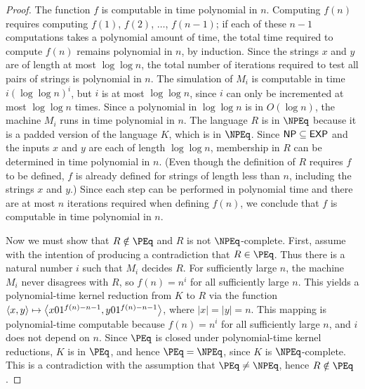 \begin{proof}
  The function $f$ is computable in time polynomial in $n$.
  Computing $f(n)$ requires computing $f(1)$, $f(2)$, $\dotsc$, $f(n - 1)$; if each of these $n - 1$ computations takes a polynomial amount of time, the total time required to compute $f(n)$ remains polynomial in $n$, by induction.
  Since the strings $x$ and $y$ are of length at most $\log \log n$, the total number of iterations required to test all pairs of strings is polynomial in $n$.
  The simulation of $M_i$ is computable in time $i (\log \log n)^i$, but $i$ is at most $\log \log n$, since $i$ can only be incremented at most $\log \log n$ times.
  Since a polynomial in $\log \log n$ is in $O(\log n)$, the machine $M_i$ runs in time polynomial in $n$.
  The language $R$ is in $\NPEq$ because it is a padded version of the language $K$, which is in $\NPEq$.
  Since ${\mathsf{NP}} \subseteq {\ensuremath{\mathsf{EXP}}}$ and the inputs $x$ and $y$ are each of length $\log \log n$, membership in $R$ can be determined in time polynomial in $n$.
  (Even though the definition of $R$ requires $f$ to be defined, $f$ is already defined for strings of length less than $n$, including the strings $x$ and $y$.)
  Since each step can be performed in polynomial time and there are at most $n$ iterations required when defining $f(n)$, we conclude that $f$ is computable in time polynomial in $n$.

  Now we must show that $R \notin \PEq$ and $R$ is not $\NPEq$-complete.
  First, assume with the intention of producing a contradiction that $R \in \PEq$.
  Thus there is a natural number $i$ such that $M_i$ decides $R$.
  For sufficiently large $n$, the machine $M_i$ never disagrees with $R$, so $f(n) = n^i$ for all sufficiently large $n$.
  This yields a polynomial-time kernel reduction from $K$ to $R$ via the function $\langle x,y\rangle \mapsto \left\langle x 0 1^{f(n) - n - 1}, y 0 1^{f(n) - n - 1}\right\rangle$, where $|x| = |y| = n$.
  This mapping is polynomial-time computable because $f(n) = n^i$ for all sufficiently large $n$, and $i$ does not depend on $n$.
  Since $\PEq$ is closed under polynomial-time kernel reductions, $K$ is in $\PEq$, and hence $\PEq = \NPEq$, since $K$ is $\NPEq$-complete.
  This is a contradiction with the assumption that $\PEq \neq \NPEq$, hence $R \notin \PEq$.


\end{proof}
